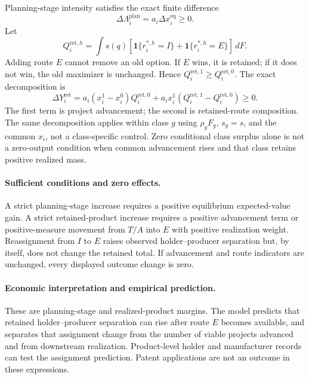 Planning-stage intensity satisfies the exact finite difference
\begin{equation}
  \Delta\Lambda_i^{\mathrm{plan}}
  =
  a_i\Delta x_i^{\mathrm{eq}}\geq0.
  \label{eq:p15-planning-change}
\end{equation}
Let
\[
  Q_i^{\mathrm{ret},h}
  =
  \int s(q)
  [\mathbf 1\{r_i^{*,h}=I\}+\mathbf 1\{r_i^{*,h}=E\}]\,dF.
\]
Adding route \(E\) cannot remove an old option. If \(E\) wins, it is retained;
if it does not win, the old maximizer is unchanged. Hence
\(Q_i^{\mathrm{ret},1}\geq Q_i^{\mathrm{ret},0}\). The exact decomposition is
\begin{equation}
  \Delta Y_i^{\mathrm{ret}}
  =
  a_i(x_i^1-x_i^0)Q_i^{\mathrm{ret},0}
  +
  a_ix_i^1
  (Q_i^{\mathrm{ret},1}-Q_i^{\mathrm{ret},0})
  \geq0.
  \label{eq:p15-retained-outcome-change}
\end{equation}
The first term is project advancement; the second is retained-route
composition. The same decomposition applies within class \(g\) using
\(\rho_gF_g\), \(s_g=s\), and the common \(x_i\), not a class-specific
control. Zero conditional class surplus alone is not a zero-output condition
when common advancement rises and that class retains positive realized mass.

\paragraph{Sufficient conditions and zero effects.}
A strict planning-stage increase requires a positive equilibrium expected-value
gain. A strict retained-product increase requires a positive advancement term
or positive-measure movement from \(T/A\) into \(E\) with positive realization
weight. Reassignment from \(I\) to \(E\) raises observed holder--producer
separation but, by itself, does not change the retained total. If advancement
and route indicators are unchanged, every displayed outcome change is zero.

\paragraph{Economic interpretation and empirical prediction.}
These are planning-stage and realized-product margins. The model predicts that
retained holder--producer separation can rise after route \(E\) becomes
available, and separates that assignment change from the number of viable
projects advanced and from downstream realization. Product-level holder and
manufacturer records can test the assignment prediction. Patent applications
are not an outcome in these expressions.

